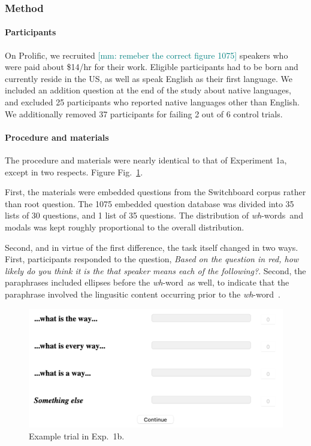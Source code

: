 \documentclass[12pt,letterpaper,table,svgnames,dvipsnames]{article}
\newcommand{\jd}[1]{\textcolor{Purple}{[jd: #1]}}
\newcommand{\mm}[1]{\textcolor{teal}{[mm: #1]}}
\newcommand{\figref}[1]{Fig.~\ref{#1}}
\newcommand{\whw}{\emph{wh}-word~}
\newcommand{\whws}{\emph{wh}-words~}
\begin{document}

\subsubsection{Method}

\paragraph{Participants}
On Prolific, we recruited \mm{remeber the correct figure 1075} speakers who were paid about \$14/hr for their work. Eligible participants had to be born and currently reside in the US, as well as speak English as their first language. We included an addition question at the end of the study about native languages, and excluded 25 participants who reported native languages other than English. We additionally removed 37 participants for failing 2 out of 6 control trials.

\paragraph{Procedure and materials}
The procedure and materials were nearly identical to that of Experiment 1a, except in two respects. Figure \figref{trial-ex1b}.

First, the materials were embedded questions from the Switchboard corpus rather than root question. The 1075 embedded question database was divided into 35 lists of 30 questions, and 1 list of 35 questions. The distribution of \whws and modals was kept roughly proportional to the overall distribution.

Second, and in virtue of the first difference, the task itself changed in two ways. First, participants responded to the question, \emph{Based on the question in red, how likely do you think it is the that speaker means each of the following?}. Second, the paraphrases included ellipses before the \whw as well, to indicate that the paraphrase involved the lingusitic content occurring prior to the \whw.

\begin{figure}%
\centering
\includegraphics[scale=.5]{figures/sliders_eq.png}
\caption{Example trial in Exp.~1b.}
\label{trial-ex1b}
\end{figure}
\end{document}
